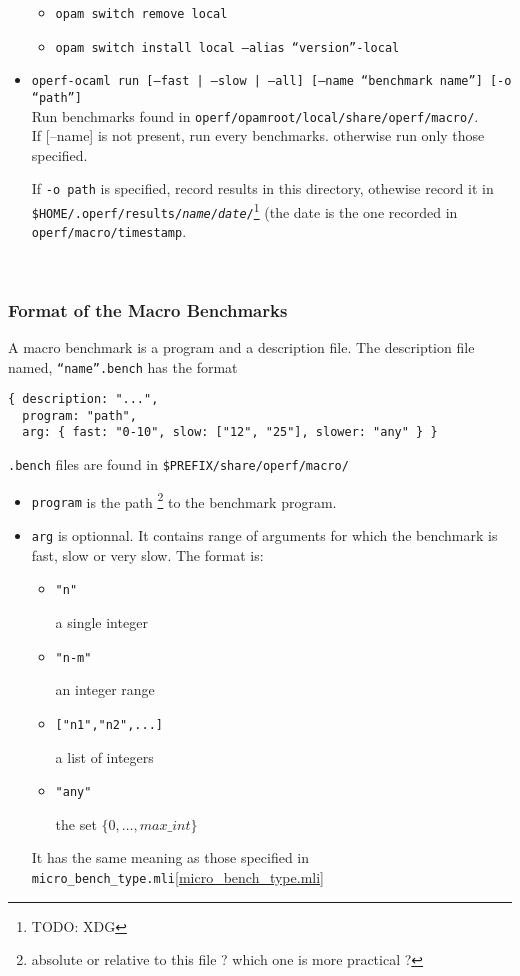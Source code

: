 \documentclass[11pt,a4paper]{article}
\begin{document}
\begin{itemize}
  \begin{itemize}
  \item {\tt opam switch remove local}
  \item {\tt opam switch install local --alias ``version''-local}
  \end{itemize}
\item {\tt operf-ocaml run [--fast | --slow | --all] [--name ``benchmark name''] [-o ``path'']}\\
  Run benchmarks found in {\tt operf/opamroot/local/share/operf/macro/}.\\
  If [--name] is not present, run every benchmarks.
  otherwise run only those specified.

  If {\tt -o path} is specified, record results in this directory,
  othewise record it in {\tt
    \$HOME/.operf/results/{\em name}/{\em date}/}\footnote{TODO: XDG}
  (the date is the one recorded in {\tt operf/macro/timestamp}.

\end{itemize}

~\vspace{4cm}~

\subsubsection{Format of the Macro Benchmarks}

A macro benchmark is a program and a description file. The description
file named, {\tt ``name''.bench} has the format
\begin{verbatim}
{ description: "...",
  program: "path",
  arg: { fast: "0-10", slow: ["12", "25"], slower: "any" } }
\end{verbatim}

{\tt .bench} files are found in {\tt \$PREFIX/share/operf/macro/}

\begin{itemize}
\item {\tt program} is the path \footnote{absolute or relative to this
  file ? which one is more practical ?} to the benchmark program.
\item {\tt arg} is optionnal. It contains range of arguments for which
  the benchmark is fast, slow or very slow. The format is:
  \begin{itemize}
  \item \begin{verbatim}"n"\end{verbatim} a single integer
  \item \begin{verbatim}"n-m"\end{verbatim} an integer range
  \item \begin{verbatim}["n1","n2",...]\end{verbatim} a list of integers
  \item \begin{verbatim}"any"\end{verbatim} the set $\{0, \ldots, max\_int\}$
  \end{itemize}
  It has the same meaning as those specified in {\tt micro\_bench\_type.mli}\ref{micro_bench_type.mli}
\end{itemize}
\end{document}
